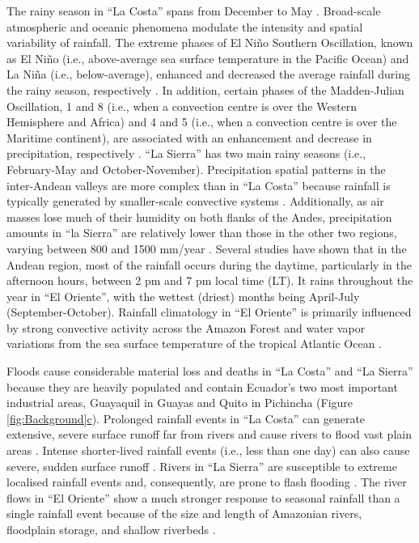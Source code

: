 \documentclass[techmemo]{ecmwfrep}%
\begin{document}
The rainy season in “La Costa” spans from December to May \citep{Ilbay2021}. Broad-scale atmospheric and oceanic phenomena modulate the intensity and spatial variability of rainfall. The extreme phases of El Niño Southern Oscillation, known as El Niño (i.e., above-average sea surface temperature in the Pacific Ocean) and La Niña (i.e., below-average), enhanced and decreased the average rainfall during the rainy season, respectively \citep{Recalde-Coronel2014, Tobar2018}. In addition, certain phases of the Madden-Julian Oscillation, 1 and 8 (i.e., when a convection centre is over the Western Hemisphere and Africa) and 4 and 5 (i.e., when a convection centre is over the Maritime continent), are associated with an enhancement and decrease in precipitation, respectively \citep{Recalde-Coronel2020}. “La Sierra” has two main rainy seasons (i.e., February-May and October-November). Precipitation spatial patterns in the inter-Andean valleys are more complex than in “La Costa” because rainfall is typically generated by smaller-scale convective systems \citep{Vuille2000}. Additionally, as air masses lose much of their humidity on both flanks of the Andes, precipitation amounts in “la Sierra” are relatively lower than those in the other two regions, varying between 800 and 1500 mm/year \citep{Buytaert2006, Vuille2000}. Several studies \citep{Bendix2006, Buytaert2006, Junquas2022} have shown that in the Andean region, most of the rainfall occurs during the daytime, particularly in the afternoon hours, between 2 pm and 7 pm local time (LT). It rains throughout the year in “El Oriente”, with the wettest (driest) months being April-July (September-October). Rainfall climatology in “El Oriente” is primarily influenced by strong convective activity across the Amazon Forest and water vapor variations from the sea surface temperature of the tropical Atlantic Ocean \citep{Vuille2000}.

Floods cause considerable material loss and deaths in “La Costa” and “La Sierra” because they are heavily populated and contain Ecuador’s two most important industrial areas, Guayaquil in Guayas and Quito in Pichincha 
(Figure \ref{fig:Background}\hyperref[fig:Background]{c}). Prolonged rainfall events in “La Costa” can generate extensive, severe surface runoff far from rivers and cause rivers to flood vast plain areas \citep{Galarza-Villamar2018}. Intense shorter-lived rainfall events (i.e., less than one day) can also cause severe, sudden surface runoff \citep{Galarza-Villamar2018}. Rivers in “La Sierra” are susceptible to extreme localised rainfall events and, consequently, are prone to flash flooding \citep{Laraque2009, Pinos2020}. The river flows in “El Oriente” show a much stronger response to seasonal rainfall than a single rainfall event because of the size and length of Amazonian rivers, floodplain storage, and shallow riverbeds \citep{Trigg2009}.
\end{document}
